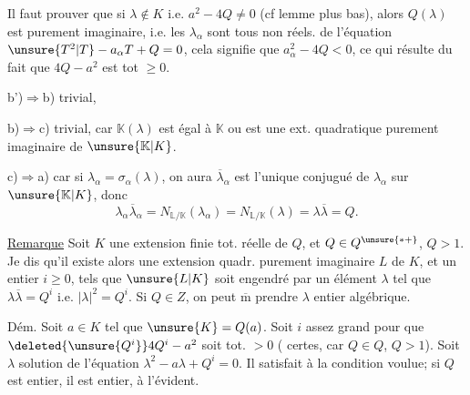  Il faut prouver que si $\lambda\notin K$ i.e. $a^2-4Q\ne0$ (cf lemme plus bas), alors  $Q(\lambda)$ est purement imaginaire, i.e. les $\lambda_\alpha$ sont tous non réels.   de l'équation $\unsure{T^2|T}-a_\alpha T+Q=0$, cela signifie que $a_\alpha^2-4Q<0$, ce qui résulte du fait que $4Q-a^2$ est tot $\ge0$.

b')$\Rightarrow$b) trivial, 

b)$\Rightarrow$c) trivial, car $\mathbb K(\lambda)$ est égal à $\mathbb K$ ou est une ext. quadratique purement imaginaire de $\unsure{\mathbb K|K}$.

c)$\Longrightarrow$a) car si $\lambda_\alpha=\sigma_\alpha(\lambda)$, on aura   $\overline\lambda_\alpha$ est l'unique \deleted{\unsure{$\lambda$}} conjugué de $\lambda_\alpha$ sur $\unsure{\mathbb K|K}$,  donc
\[
\lambda_\alpha\overline\lambda_\alpha=N_{\mathbb L/\mathbb K}(\lambda_\alpha)=N_{\mathbb L/\mathbb K}(\lambda)=\lambda\overline\lambda=Q.
\]


\uline{Remarque} Soit $K$ une extension finie tot. réelle de $Q$, et $Q\in Q^{\unsure{*+}}$, $Q>1$. Je dis qu'il existe alors une extension quadr. purement imaginaire $L$ de $K$,  et un entier $i\ge0$,  tels que $\unsure{L|K}$ soit engendré  par un élément $\lambda$ tel que $\lambda\overline\lambda=Q^i$ i.e. $|\lambda|^2=Q^i$. Si $Q\in Z$, on peut $\overline{\mathrm m}$ prendre $\lambda$ entier algébrique.

Dém. Soit $a\in K$ tel que $\unsure{K}=Q(a)$.  Soit $i$ assez grand pour que $\deleted{\unsure{Q^i}}4Q^i-a^2$ soit tot. $>0$ ( certes, car $Q\in Q$, $Q>1$). Soit $\lambda$ solution de l'équation $\lambda^2-a\lambda+Q^i=0$. Il satisfait à la condition voulue; si $Q$ est entier, il est entier, à l'évident.
